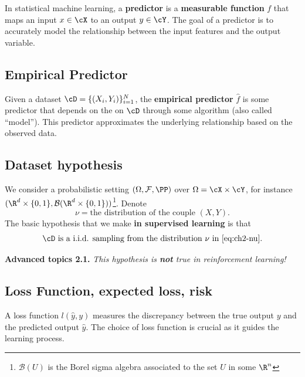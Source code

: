 In statistical machine learning, a \textbf{predictor} is a \textbf{measurable function} $f$
that maps an input $x \in \cX$ to an output $y \in \cY$. The goal of a predictor is to
accurately model the relationship between the input features and the output
variable.

\subsection{Empirical Predictor}
\label{sec:ch2-emppredictor}

Given a dataset $\cD = \{(X_i, Y_i)\}_{i=1}^{N}$, the \textbf{empirical predictor} $\hat{f}$ is some predictor
that depends on the on $\cD$ through some algorithm (also called ``model'').
This predictor approximates the underlying relationship based on the observed
data.

\subsection{Dataset hypothesis}
\label{sec:ch2-datasethyp}

We consider a probabilistic setting $(\Omega, \mathcal{F}, \PP)$ over $\Omega = \cX \times \cY$, for instance
$(\R^d \times \{0,1\}, \mathcal{B}(\R^d \times \{0,1\}))$\footnote{$\mathcal{B}(U)$ is the Borel sigma algebra associated to the set $U$ in some $\R^n$}. Denote
\begin{equation}\label{eq:ch2-nu}
\nu = \text{the distribution of the couple } (X, Y).
\end{equation}
The basic hypothesis that we make \textbf{in supervised learning} is that
\begin{equation}\label{eq:ch2-iid}
\cD \text{ is a i.i.d. sampling from the distribution } \nu \text{ in \eqref{eq:ch2-nu}.}
\end{equation}

\begin{tcolorbox}[advancedbox]
\textbf{Advanced topics 2.1.} \textit{This hypothesis is \textbf{not} true in reinforcement learning!}
\end{tcolorbox}

\subsection{Loss Function, expected loss, risk}
\label{sec:ch2-loss}

A loss function $l(\hat{y}, y)$ measures the discrepancy between the true output $y$
and the predicted output $\hat{y}$. The choice of loss function is crucial as it guides
the learning process.

